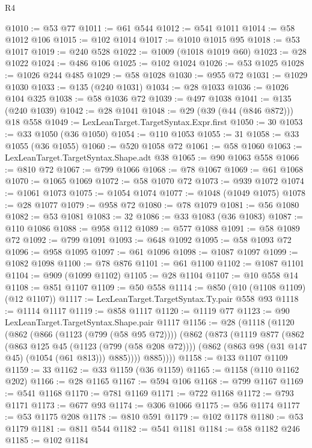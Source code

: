 \begin{lexlean}{R4}
\begin{coremodule}
@1010 := @53 @77
@1011 := @61 @544
@1012 := @541 @1011
@1014 := @58 @1012 @106
@1015 := @102 @1014
@1017 := @1010 @1015 @95
@1018 := @53 @1017
@1019 := @240 @528
@1022 := @1009 (@1018 @1019 @60)
@1023 := @28 @1022
@1024 := @486 @106
@1025 := @102 @1024
@1026 := @53 @1025
@1028 := @1026 @244 @485
@1029 := @58 @1028
@1030 := @955 @72
@1031 := @1029 @1030
@1033 := @135 (@240 @1031)
@1034 := @28 @1033
@1036 := @1026 @104 @325
@1038 := @58 @1036 @72
@1039 := @497 @1038
@1041 := @135 (@240 @1039)
@1042 := @28 @1041
@1048 := @29 (@39 (@44 (@846 @872))) @18 @558
@1049 := LexLeanTarget.TargetSyntax.Expr.first
@1050 := 30
@1053 := @33 @1050 (@36 @1050)
@1054 := @110 @1053
@1055 := 31
@1058 := @33 @1055 (@36 @1055)
@1060 := @520 @1058 @72
@1061 := @58 @1060
@1063 := LexLeanTarget.TargetSyntax.Shape.adt @38
@1065 := @90 @1063 @558
@1066 := @810 @72
@1067 := @799 @1066
@1068 := @78 @1067
@1069 := @61 @1068
@1070 := @1065 @1069
@1072 := @58 @1070 @72
@1073 := @939 @1072
@1074 := @1061 @1073
@1075 := @1054 @1074
@1077 := @1048 (@1049 @1075)
@1078 := @28 @1077
@1079 := @958 @72
@1080 := @78 @1079
@1081 := @56 @1080
@1082 := @53 @1081
@1083 := 32
@1086 := @33 @1083 (@36 @1083)
@1087 := @110 @1086
@1088 := @958 @112
@1089 := @577 @1088
@1091 := @58 @1089 @72
@1092 := @799 @1091
@1093 := @648 @1092
@1095 := @58 @1093 @72
@1096 := @958 @1095
@1097 := @61 @1096
@1098 := @1087 @1097
@1099 := @1082 @1098
@1100 := @78 @876
@1101 := @61 @1100
@1102 := @1087 @1101
@1104 := @909 (@1099 @1102)
@1105 := @28 @1104
@1107 := @10 @558 @14
@1108 := @851 @1107
@1109 := @50 @558
@1114 := @850 (@10 (@1108 @1109) (@12 @1107))
@1117 := LexLeanTarget.TargetSyntax.Ty.pair @558 @93
@1118 := @1114 @1117
@1119 := @858 @1117
@1120 := @1119 @77
@1123 := @90 LexLeanTarget.TargetSyntax.Shape.pair @1117
@1156 := @28
    (@1118
      (@1120
        (@862
          (@866 (@1123 (@799 (@58 @95 @72))))
          (@862
            (@873
              (@1119
                @877
                (@862
                  (@863 @125 @45 (@1123 (@799 (@58 @208 @72))))
                  (@862 (@863 @98 (@31 @147 @45) (@1054 (@61 @813))) @885))))
            @885))))
@1158 := @133 @1107 @1109
@1159 := 33
@1162 := @33 @1159 (@36 @1159)
@1165 := @1158 (@110 @1162 @202)
@1166 := @28 @1165
@1167 := @594 @106
@1168 := @799 @1167
@1169 := @541 @1168
@1170 := @781 @1169
@1171 := @722 @1168
@1172 := @793 @1171
@1173 := @677 @93
@1174 := @306 @1066
@1175 := @56 @1174
@1177 := @53 @1175 @208
@1178 := @810 @591
@1179 := @102 @1178
@1180 := @53 @1179
@1181 := @811 @544
@1182 := @541 @1181
@1184 := @58 @1182 @246
@1185 := @102 @1184

\end{coremodule}
\end{lexlean}
